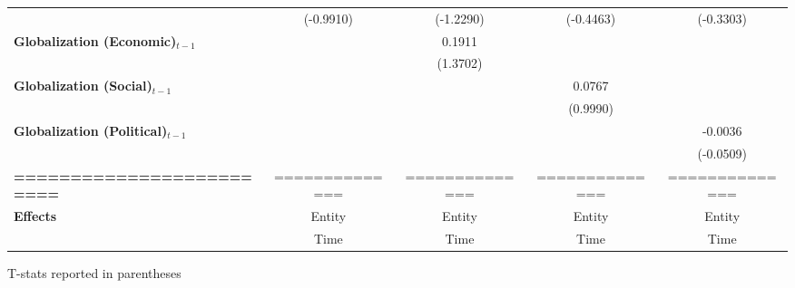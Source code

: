 \begin{center}
\begin{tabular}{lcccc}
\textbf{ }                         &   (-0.9910)    &    (-1.2290)     &    (-0.4463)     &    (-0.3303)      \\
\textbf{Globalization (Economic)$_{t-1}$}             &                &      0.1911      &                  &                   \\
\textbf{ }                         &                &     (1.3702)     &                  &                   \\
\textbf{Globalization (Social)$_{t-1}$}             &                &                  &      0.0767      &                   \\
\textbf{ }                         &                &                  &     (0.9990)     &                   \\
\textbf{Globalization (Political)$_{t-1}$}             &                &                  &                  &     -0.0036       \\
\textbf{ }                         &                &                  &                  &    (-0.0509)      \\
\textbf{=========================} & ============== &  ==============  &  ==============  &  ==============   \\
\textbf{Effects}                   &     Entity     &      Entity      &      Entity      &      Entity       \\
\textbf{}                          &      Time      &       Time       &       Time       &       Time        \\
\bottomrule
\end{tabular}
\end{center}

T-stats reported in parentheses